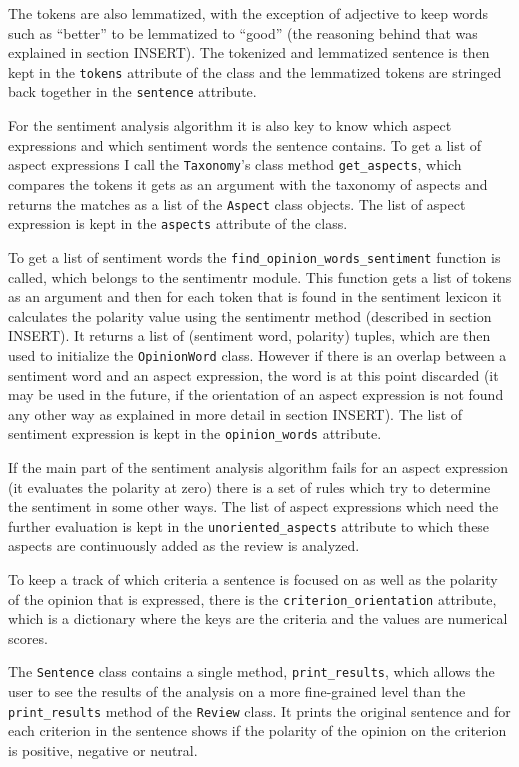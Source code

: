 The tokens are also lemmatized, with the exception of adjective to keep words such as ``better'' to be lemmatized to ``good'' (the reasoning behind that was explained in section INSERT).
The tokenized and lemmatized sentence is then kept in the \texttt{tokens} attribute of the class and the lemmatized tokens are stringed back together in the \texttt{sentence} attribute. 

For the sentiment analysis algorithm it is also key to know which aspect expressions and which sentiment words the sentence contains. To get a list of aspect expressions I call the \texttt{Taxonomy}'s class method \texttt{get\_aspects}, which compares the tokens it gets as an argument with the taxonomy of aspects and returns the matches as a list of the \texttt{Aspect} class objects. The list of aspect expression is kept in the \texttt{aspects} attribute of the class.

To get a list of sentiment words the \texttt{find\_opinion\_words\_sentiment} function is called, which belongs to the sentimentr module. This function gets a list of tokens as an argument and then for each token that is found in the sentiment lexicon it calculates the polarity value using the sentimentr method (described in section INSERT). It returns a list of (sentiment word, polarity) tuples, which are then used to initialize the \texttt{OpinionWord} class. However if there is an overlap between a sentiment word and an aspect expression, the word is at this point discarded (it may be used in the future, if the orientation of an aspect expression is not found any other way as explained in more detail in section INSERT). The list of sentiment expression is kept in the \texttt{opinion\_words} attribute.

If the main part of the sentiment analysis algorithm fails for an aspect expression (it evaluates the polarity at zero) there is a set of rules which try to determine the sentiment in some other ways. The list of aspect expressions which need the further evaluation is kept in the \texttt{unoriented\_aspects} attribute to which these aspects are continuously added as the review is analyzed.

To keep a track of which criteria a sentence is focused on as well as the polarity of the opinion that is expressed, there is the \texttt{criterion\_orientation} attribute, which is a dictionary where the keys are the criteria and the values are numerical scores.

The \texttt{Sentence} class contains a single method, \texttt{print\_results}, which allows the user to see the results of the analysis on a more fine-grained level than the \texttt{print\_results} method of the \texttt{Review} class. It prints the original sentence and for each criterion in the sentence shows if the polarity of the opinion on the criterion is positive, negative or neutral.


